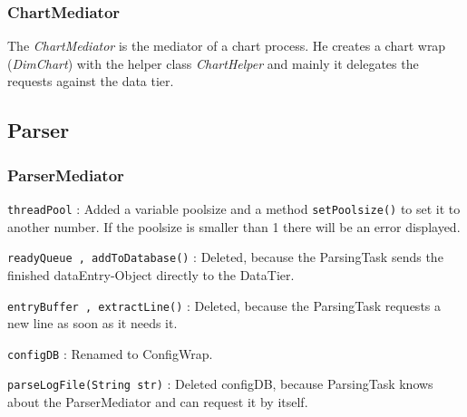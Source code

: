 \subsubsection{ChartMediator}
The \textit{ChartMediator} is the mediator of a chart process. He creates a chart wrap
(\textit{DimChart}) with the helper class \textit{ChartHelper}
and mainly it delegates the requests against the data tier.






































\subsection{Parser}

\subsubsection{ParserMediator}

\texttt{threadPool} : Added a variable poolsize and a method \texttt{setPoolsize()} to set it to another number. 
If the poolsize is smaller than 1 there will be an error displayed. \newline\newline

\texttt{readyQueue , addToDatabase()} : Deleted, because the ParsingTask sends the finished dataEntry-Object directly to the DataTier.
\newline

\texttt{entryBuffer , extractLine()} : Deleted, because the ParsingTask requests a new line as soon as it needs it.\newline

\texttt{configDB} : Renamed to ConfigWrap.\newline

\texttt{parseLogFile(String str)} : Deleted configDB, because ParsingTask knows about the ParserMediator and can request it by itself.
\newline\newline

